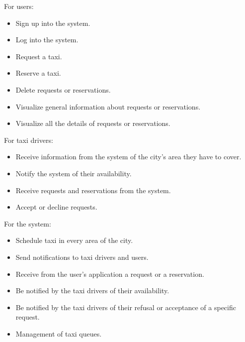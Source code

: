 For users:
\begin{itemize}
	\item Sign up into the system.
	\item Log into the system.
	\item Request a taxi.
	\item Reserve a taxi.
	\item Delete requests or reservations.
	\item Visualize general information about requests or reservations.
	\item Visualize all the details of requests or reservations.
\end{itemize}

For taxi drivers:
\begin{itemize}
	\item Receive information from the system of the city's area they have to cover.
	\item Notify the system of their availability.
	\item Receive requests and reservations from the system.
	\item Accept or decline requests.
\end{itemize}

For the system:
\begin{itemize}
	\item Schedule taxi in every area of the city.
	\item Send notifications to taxi drivers and users.
	\item Receive from the user's application a request or a reservation.
	\item Be notified by the taxi drivers of their availability.
	\item Be notified by the taxi drivers of their refusal or acceptance of a specific request.
	\item Management of taxi queues.
\end{itemize}